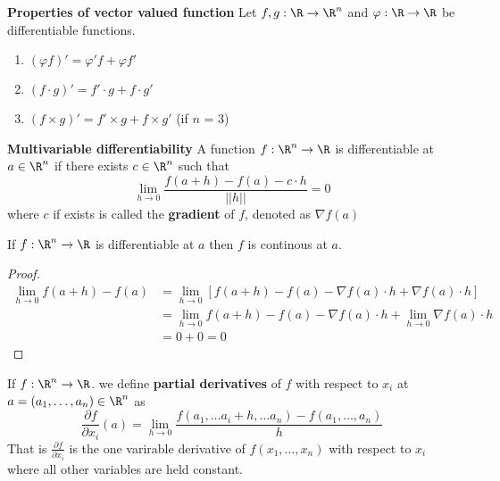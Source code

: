 \documentclass[11pt]{article}
\begin{document}
\begin{proposition*}
  \label{Properties of vector valued function} \textbf{Properties of vector valued function} Let $f,g:\R\rightarrow \R^n$ and $\varphi: \R\rightarrow \R$ be differentiable functions.
  \begin{enumerate}
    \item $(\varphi f)' = \varphi'f + \varphi f'$
    \item $(f\cdot g)' = f'\cdot g + f\cdot g'$
    \item $(f\times g)' = f' \times g + f \times g'$  (if $n$ = 3)
  \end{enumerate}
\end{proposition*}

\begin{defn*}
  \label{multivariable differentiability}
  \textbf{Multivariable differentiability}
  A function $f:\R^n \rightarrow \R$ is differentiable at $a\in\R^n$ if there exists $c\in\R^n$ such that
  \[
    \lim_{h\to 0} \frac{f(a+h) - f(a) - c\cdot h}{|| h ||} = 0
  \]
  where $c$ if exists is called the \textbf{gradient} of $f$, denoted as $\nabla f(a)$
\end{defn*}

\begin{theorem*}
  \label{differentiability implies continuity}
  If $f:\R^n \rightarrow \R$ is differentiable at $a$ then $f$ is continous at $a$.
  \begin{proof}
    $ $\\
    \begin{align*}
      \lim_{h\to 0} f(a+h)-f(a) &= \lim_{h\to 0} [f(a+h)-f(a) - \nabla f(a)\cdot h + \nabla f(a)\cdot h] \\
      &= \lim_{h\to 0} f(a+h)-f(a) - \nabla f(a)\cdot h + \lim_{h\to 0} \nabla f(a)\cdot h\\
      &= 0 + 0 = 0
    \end{align*}
  \end{proof}
\end{theorem*}



\begin{defn*}
  \label{partial derivatives}
  If $f:\R^n \to \R$. we define \textbf{partial derivatives} of $f$ with respect to $x_i$ at $a=(a_1, \dots, a_n)\in \R^n$ as
  \[
    \frac{\partial f}{\partial x_i}(a) = \lim_{h\to 0}\frac{f(a_1, \dots a_i + h, \dots a_n) - f(a_1, \dots, a_n)}{h}
  \]
  That is $\frac{\partial f}{\partial x_i}$ is the one varirable derivative of $f(x_1, \dots, x_n)$ with respect to $x_i$ where all other variables are held constant.
\end{defn*}
\end{document}
